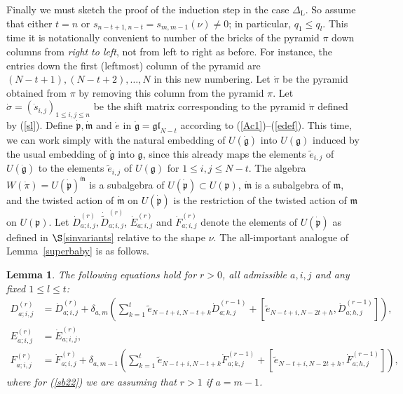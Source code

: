 \documentclass[twoside,12pt,reqno]{amsart}
\newtheorem{Lemma}[Proposition]{Lemma}
\def\lt{{\operatorname{\scriptscriptstyle L}}}
\begin{document}
Finally we must sketch the proof of the induction step in the case
$\Delta_{\lt}$. So assume that either $t=n$ or $s_{n-t+1,n-t} = s_{m,m-1}(\nu) \neq 0$;
in particular, $q_1 \leq q_l$.
This time it is 
notationally convenient to number of the bricks of the pyramid $\pi$ 
down columns from {\em right to left}, not 
from left to right as before. 
For instance, the entries down the first 
(leftmost) column of the pyramid are $(N-t+1),(N-t+2),\dots,N$ in this new 
numbering. 
Let $\dot\pi$ be the 
pyramid
obtained from $\pi$ by removing this column from the pyramid $\pi$.
Let $\dot\sigma = (\dot s_{i,j})_{1 \leq i,j \leq n}$ be the
shift matrix corresponding to the pyramid $\dot\pi$ defined by (\ref{sl}).
Define $\dot{\mathfrak{p}}, \dot{\mathfrak{m}}$ and $\dot e$
in $\dot{\mathfrak{g}} = \mathfrak{gl}_{N-t}$
according to (\ref{Ac1})--(\ref{edef}).
This time, we can work simply with the natural embedding
of $U(\dot{\mathfrak{g}})$ into $U(\mathfrak{g})$ induced by
the usual embedding of $\dot{\mathfrak{g}}$ into $\mathfrak{g}$, since this
already maps
the elements $\tilde e_{i,j}$ of $U(\dot{\mathfrak{g}})$ 
to the elements $\tilde e_{i,j}$ of $U(\mathfrak{g})$
for $1 \leq i,j \leq N-t$.
The algebra $W(\dot\pi) = U(\dot{\mathfrak{p}})^{\dot{\mathfrak{m}}}$
is a subalgebra of $U(\dot{\mathfrak{p}}) \subset U(\mathfrak{p})$, 
$\dot{\mathfrak{m}}$ is a subalgebra of
$\mathfrak{m}$, and the twisted action of
$\dot{\mathfrak{m}}$ on $U(\dot{\mathfrak{p}})$ is the restriction of the
twisted action of $\mathfrak{m}$ on $U(\mathfrak{p})$.
Let $\dot D_{a;i,j}^{(r)}, \dot{{\widetilde D}}_{a;i,j}^{(r)}$,
$\dot E_{a;i,j}^{(r)}$ and $\dot F_{a;i,j}^{(r)}$ denote the
elements of $U(\dot{\mathfrak{p}})$ as defined in $\S$\ref{sinvariants}
relative to the shape $\nu$.
The all-important analogue of Lemma~\ref{superbaby} is as follows.

\begin{Lemma}\label{superbaby2}
The following equations hold for $r > 0$, all admissible $a,i,j$ and 
any fixed $1 \leq l \leq t$:
\begin{align}\label{sb21}
D_{a;i,j}^{(r)} & = \dot D_{a;i,j}^{(r)} + \delta_{a,m}
\left(\sum_{k=1}^t
\tilde e_{N-t+i,N-t+k} \dot D_{a;k,j}^{(r-1)}
+[\tilde e_{N-t+i,N-2t+h}, \dot D_{a;h,j}^{(r-1)}]\right),\\
E_{a;i,j}^{(r)} & = \dot E_{a;i,j}^{(r)},\\
F_{a;i,j}^{(r)} & = \dot F_{a;i,j}^{(r)} + \delta_{a,m-1}\left(
\sum_{k=1}^t \tilde e_{N-t+i,N-t+k} \dot F_{a;k,j}^{(r-1)}
+ [\tilde e_{N-t+i,N-2t+h},\dot F_{a;h,j}^{(r-1)}]\right),\label{sb22}
\end{align}
where for (\ref{sb22}) we are assuming that $r > 1$ if $a=m-1$.
\end{Lemma}
\end{document}
